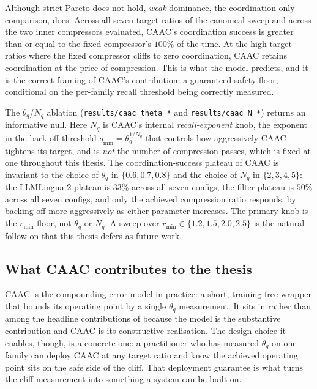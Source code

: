 Although strict-Pareto does not hold, \emph{weak} dominance, the
coordination-only comparison, does. Across all seven target
ratios of the canonical sweep and across the two inner
compressors evaluated, CAAC's coordination success is greater
than or equal to the fixed compressor's $100\%$ of the time. At
the high target ratios where the fixed compressor cliffs to zero
coordination, CAAC retains coordination at the price of
compression. This is what the model predicts, and it is the
correct framing of CAAC's contribution: a guaranteed safety
floor, conditional on the per-family recall threshold being
correctly measured.

The $\theta_q$/$N_q$ ablation
(\texttt{results/caac\_theta\_*} and \texttt{results/caac\_N\_*})
returns an informative null. Here $N_q$ is CAAC's internal
\emph{recall-exponent} knob, the exponent in the back-off
threshold $q_\text{min}=\theta_q^{1/N_q}$ that controls how
aggressively CAAC tightens its target, and is \emph{not} the
number of compression passes, which is fixed at one throughout
this thesis. The coordination-success plateau of
CAAC is invariant to the choice of $\theta_q$ in $\{0.6, 0.7,
0.8\}$ and the choice of $N_q$ in $\{2, 3, 4, 5\}$: the LLMLingua-2
plateau is $33\%$ across all seven configs, the filter plateau
is $50\%$ across all seven configs, and only the achieved
compression ratio responds, by backing off more aggressively as
either parameter increases. The primary knob is the
$r_\text{min}$ floor, not $\theta_q$ or $N_q$. A sweep over
$r_\text{min} \in \{1.2, 1.5, 2.0, 2.5\}$ is the natural follow-on
that this thesis defers as future work.

\subsection{What CAAC contributes to the thesis}

CAAC is the compounding-error model in practice: a short,
training-free wrapper that bounds its operating point by a single
$\theta_q$ measurement. It sits in  rather than among the
headline contributions of  because the model is
the substantive contribution and CAAC is its constructive
realisation. The design choice it enables, though, is a concrete one:
a practitioner who has measured $\theta_q$ on one family can deploy
CAAC at any target ratio and know the achieved operating point sits
on the safe side of the cliff. That deployment guarantee is what
turns the cliff measurement into something a system can be built on.

